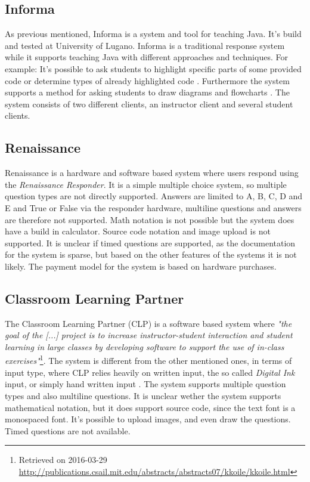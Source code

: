 \subsection*{Informa}
As previous mentioned, Informa is a system and tool for teaching Java. It's build and tested at University of Lugano. Informa is a traditional response system while it supports teaching Java with different approaches and techniques. For example: It's possible to ask students to highlight specific parts of some provided code or determine types of already highlighted code \cite[p.~2]{Hauswirth09}. Furthermore the system supports a method for asking students to draw diagrams and flowcharts \cite[p.~3]{Hauswirth09}. 
The system consists of two different clients, an instructor client and several student clients. 

\subsection*{Renaissance}
Renaissance is a hardware and software based system where users respond using the \emph{Renaissance Responder}. It is a simple multiple choice system, so multiple question types are not directly supported. Answers are limited to A, B, C, D and E and True or False via the responder hardware, multiline questions and answers are therefore not supported. Math notation is not possible but the system does have a build in calculator. Source code notation and image upload is not supported. It is unclear if timed questions are supported, as the documentation for the system is sparse, but based on the other features of the systems it is not likely. The payment model for the system is based on hardware purchases.

\subsection*{Classroom Learning Partner}
The Classroom Learning Partner (CLP) is a software based system where \emph{"the goal of the [...] project is to increase instructor-student interaction and student learning in large classes by developing software to support the use of in-class exercises"}\footnote{Retrieved on 2016-03-29 \url{http://publications.csail.mit.edu/abstracts/abstracts07/kkoile/kkoile.html}}. The system is different from the other mentioned ones, in terms of input type, where CLP relies heavily on written input, the so called \emph{Digital Ink} input, or simply hand written input \cite{koile2007supporting}. The system supports multiple question types and also multiline questions. It is unclear wether the system supports mathematical notation, but it does support source code, since the text font is a monospaced font. It's possible to upload images, and even draw the questions. Timed questions are not available.



